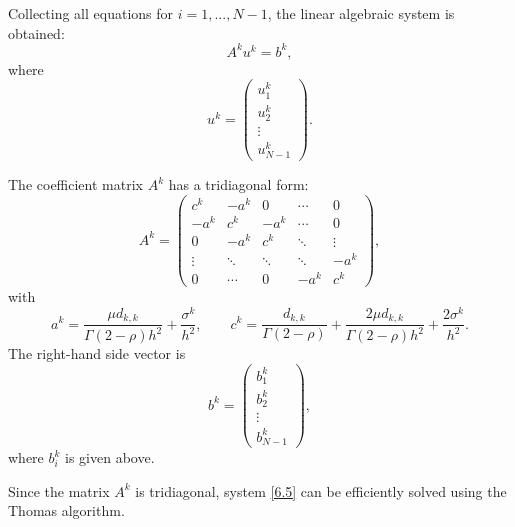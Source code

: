 \documentclass[reqno]{amsart}
\theoremstyle{definition}
\numberwithin{equation}{section}
\begin{document}
Collecting all equations for $i=1,...,N-1$, the linear algebraic system is obtained:
\begin{equation}\label{6.5}
   A^ku^k = b^k, 
\end{equation}
where 
$$
u^k=\left(\begin{array}{c}
u_1^k \\
u_2^k \\
\vdots \\
u_{N-1}^k
\end{array}\right) .
$$

The coefficient matrix $A^k$ has a tridiagonal form:
$$
A^k=\left(\begin{array}{ccccc}
c^k & -a^k & 0 & \cdots & 0 \\
-a^k & c^k & -a^k & \cdots & 0 \\
0 & -a^k & c^k & \ddots & \vdots \\
\vdots & \ddots & \ddots & \ddots & -a^k \\
0 & \cdots & 0 & -a^k & c^k
\end{array}\right),
$$
with
$$
a^k=\frac{\mu d_{k, k}}{\Gamma(2-\rho) h^2}+\frac{\sigma^k}{h^2},
\qquad c^k=\frac{d_{k, k}}{\Gamma(2-\rho)}+\frac{2 \mu d_{k, k}}{\Gamma(2-\rho) h^2}+\frac{2 \sigma^k}{h^2}.
$$
The right-hand side vector is
$$
b^k=\left(\begin{array}{c}
b_1^k \\
b_2^k \\
\vdots \\
b_{N-1}^k
\end{array}\right),
$$
where $b_i^k$ is given above.

Since the matrix $A^k$ is tridiagonal, system \eqref{6.5} can be efficiently solved using the Thomas algorithm.
\end{document}
